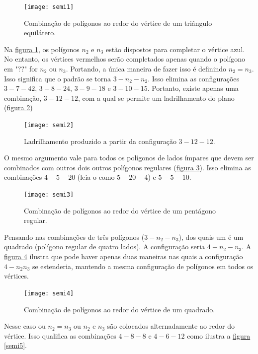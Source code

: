 \begin{figure}[H]
\centering
\texttt{[image: semi1]}
\caption{Combinação de polígonos ao redor do vértice de um triângulo equilátero.}
\label{semi1}
\end{figure}

Na \hyperref[semi1]{figura \ref{semi1}}, os polígonos $n_2$ e $n_3$ estão dispostos para completar o vértice azul. No entanto, os vértices vermelhos serão completados apenas quando o polígono em "$??$" for $n_2$ ou $n_3$. Portando, a única maneira de fazer isso é definindo $n_2 = n_3$. Isso significa que o padrão se torna $3-n_2- n_2$. 
Isso elimina as configurações $3-7-42$, $3-8-24$, $3-9-18$ e $3-10-15$. Portanto, existe apenas uma combinação, $3-12-12$, com a qual se permite um ladrilhamento do plano (\hyperref[semi2]{figura \ref{semi2}})

\begin{figure}[H]
\centering
\texttt{[image: semi2]}
\caption{Ladrilhamento produzido a partir da configuração $3-12-12$.}
\label{semi2}
\end{figure}

O mesmo argumento vale para todos os polígonos de lados ímpares que devem ser combinados com outros dois outros polígonos regulares (\hyperref[semi3]{figura \ref{semi3}}). Isso elimina as combinações $4-5-20$ (leia-o como $5-20-4$) e $5-5-10$.


\begin{figure}[H]
\centering
\texttt{[image: semi3]}
\caption{Combinação de polígonos ao redor do vértice de um pentágono regular.}
\label{semi3}
\end{figure}

Pensando nas combinações de três polígonos ($3-n_2-n_3$), dos quais um é um quadrado (polígono regular de quatro lados). A  configuração seria $4-n_2-n_3$. A \hyperref[semi4]{figura \ref{semi4}} ilustra que pode haver apenas duas maneiras nas quais a configuração $4-n_2n_3$ se estenderia, mantendo a mesma configuração de polígonos em todos os vértices. 

\begin{figure}[H]
\centering
\texttt{[image: semi4]}
\caption{Combinação de polígonos ao redor do vértice de um quadrado.}
\label{semi4}
\end{figure}

Nesse caso ou $n_2= n_3$ ou $n_2$ e $n_3$ são colocados alternadamente ao redor do vértice. Isso qualifica as combinações $4-8-8$ e $4-6-12$ como ilustra a \hyperref[semi5]{figura \ref{semi5}}.


